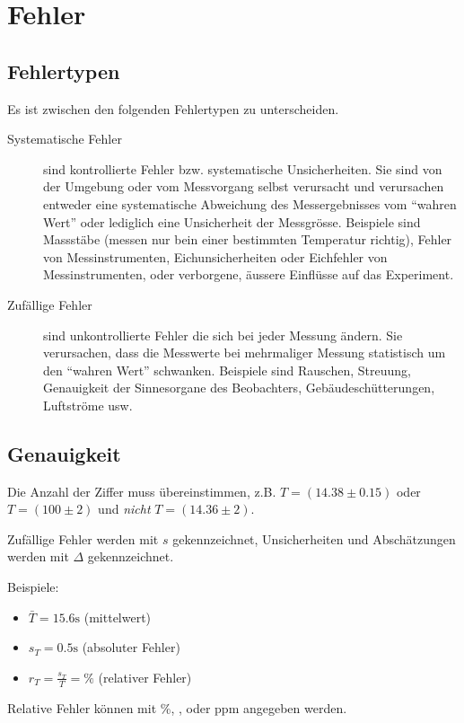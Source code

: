 \section{Fehler}

\subsection{Fehlertypen}

Es ist zwischen den folgenden Fehlertypen zu unterscheiden.
\begin{description}
    \item[Systematische Fehler] sind kontrollierte Fehler bzw. systematische Unsicherheiten. Sie sind von
    der Umgebung oder vom Messvorgang selbst verursacht und verursachen entweder eine systematische
    Abweichung des Messergebnisses vom ``wahren Wert'' oder lediglich eine Unsicherheit der Messgr\"osse.
    Beispiele sind Massst\"abe (messen nur bein einer bestimmten Temperatur richtig), Fehler von Messinstrumenten,
    Eichunsicherheiten oder Eichfehler von Messinstrumenten, oder verborgene, \"aussere Einfl\"usse auf das
    Experiment.
    \item[Zuf\"allige Fehler] sind unkontrollierte Fehler die sich bei jeder Messung \"andern. Sie verursachen,
    dass die Messwerte bei mehrmaliger Messung statistisch um den ``wahren Wert'' schwanken. Beispiele
    sind Rauschen, Streuung, Genauigkeit der Sinnesorgane des Beobachters, Geb\"audesch\"utterungen,
    Luftstr\"ome usw.
\end{description}


\subsection{Genauigkeit}

Die Anzahl der Ziffer muss \"ubereinstimmen, z.B. $T=(14.38\pm0.15)$ oder $T=(100\pm2)$ und \emph{nicht}
$T=(14.36\pm2)$.

Zuf\"allige Fehler werden mit $s$ gekennzeichnet, Unsicherheiten und Absch\"atzungen werden mit $\Delta$
gekennzeichnet.

Beispiele:
\begin{itemize}
    \item $\bar{T} = 15.6 \textrm{s}$ (mittelwert)
    \item $s_T = 0.5 \textrm{s}$ (absoluter Fehler)
    \item $r_T = \frac{s_T}{T} = \textrm{\%}$ (relativer Fehler)
\end{itemize}

Relative Fehler k\"onnen mit \%, \textperthousand, oder ppm angegeben werden.


